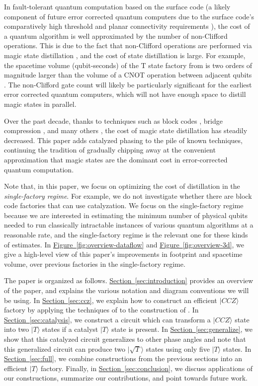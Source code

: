 \documentclass[superscriptaddress,notitlepage,longbibliography]{revtex4-1}
\renewcommand{\sec}[1]{\hyperref[sec:#1]{Section~\ref*{sec:#1}}}
\newcommand{\fig}[1]{\hyperref[fig:#1]{Figure~\ref*{fig:#1}}}
\begin{document}
In fault-tolerant quantum computation based on the surface code (a likely component of future error corrected quantum computers due to the surface code's comparatively high threshold and planar connectivity requirements \cite{Brav98,Denn02,Raus07,Raus07d,Fowl12f}), the cost of a quantum algorithm is well approximated by the number of non-Clifford operations.
This is due to the fact that non-Clifford operations are performed via magic state distillation \cite{bravyi2005}, and the cost of state distillation is large.
For example, the spacetime volume (qubit-seconds) of the T state factory from \cite{fowler2018} is two orders of magnitude larger than the volume of a CNOT operation between adjacent qubits \cite{horsman2012}.
The non-Clifford gate count will likely be particularly significant for the earliest error corrected quantum computers, which will not have enough space to distill magic states in parallel.

Over the past decade, thanks to techniques such as block codes \cite{bravyi2012, fowler2013}, bridge compression \cite{fowler2012}, and many others \cite{horsman2012, campbell2017, campbell2018, litinski2018}, the cost of magic state distillation has steadily decreased.
This paper adds catalyzed phasing to the pile of known techniques, continuing the tradition of gradually chipping away at the convenient approximation that magic states are the dominant cost in error-corrected quantum computation.

Note that, in this paper, we focus on optimizing the cost of distillation in the {\em single-factory regime}.
For example, we do not investigate whether there are block code factories that can use catalyzation.
We focus on the single-factory regime because we are interested in estimating the minimum number of physical qubits needed to run classically intractable instances of various quantum algorithms at a reasonable rate, and the single-factory regime is the relevant one for these kinds of estimates.
In \fig{overview-dataflow} and \fig{overview-3d}, we give a high-level view of this paper's improvements in footprint and spacetime volume, over previous factories in the single-factory regime.

The paper is organized as follows.
\sec{introduction} provides an overview of the paper, and explains the various notation and diagram conventions we will be using.
In \sec{ccz}, we explain how to construct an efficient $|CCZ\rangle$ factory by applying the techniques of \cite{fowler2018} to the construction of \cite{jones2013, eastin2013distilling}.
In \sec{catalysis}, we construct a circuit which can transform a $|CCZ\rangle$ state into two $|T\rangle$ states if a catalyst $|T\rangle$ state is present.
In \sec{generalize}, we show that this catalyzed circuit generalizes to other phase angles and note that this generalized circuit can produce two $|\sqrt{T}\rangle$ states using only five $|T\rangle$ states.
In \sec{full}, we combine constructions from the previous sections into an efficient $|T\rangle$ factory.
Finally, in \sec{conclusion}, we discuss applications of our constructions, summarize our contributions, and point towards future work.
\end{document}
